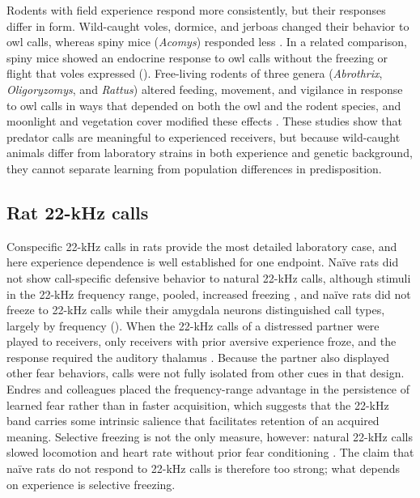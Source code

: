 Rodents with field experience respond more consistently, but their responses differ in form. Wild-caught voles, dormice, and jerboas changed their behavior to owl calls, whereas spiny mice (\textit{Acomys}) responded less \citep{HendrieEtAl1998}. In a related comparison, spiny mice showed an endocrine response to owl calls without the freezing or flight that voles expressed \citep{EilamEtAl1999} ().
Free-living rodents of three genera (\textit{Abrothrix}, \textit{Oligoryzomys}, and \textit{Rattus}) altered feeding, movement, and vigilance in response to owl calls in ways that depended on both the owl and the rodent species, and moonlight and vegetation cover modified these effects \citep{HernandezEtAl2021}. These studies show that predator calls are meaningful to experienced receivers, but because wild-caught animals differ from laboratory strains in both experience and genetic background, they cannot separate learning from population differences in predisposition.

\subsection{Rat 22-kHz calls}
\label{sec:q2-22khz}

Conspecific 22-kHz calls in rats provide the most detailed laboratory case, and here experience dependence is well established for one endpoint. Naïve rats did not show call-specific defensive behavior to natural 22-kHz calls, although stimuli in the 22-kHz frequency range, pooled, increased freezing \citep{EndresEtAl2007}, and naïve rats did not freeze to 22-kHz calls while their amygdala neurons distinguished call types, largely by frequency \citep{ParsanaEtAl2012a} (). When the 22-kHz calls of a distressed partner were played to receivers, only receivers with prior aversive experience froze, and the response required the auditory thalamus \citep{KimEtAl2010}. Because the partner also displayed other fear behaviors, calls were not fully isolated from other cues in that design. Endres and colleagues placed the frequency-range advantage in the persistence of learned fear rather than in faster acquisition, which suggests that the 22-kHz band carries some intrinsic salience that facilitates retention of an acquired meaning. Selective freezing is not the only measure, however: natural 22-kHz calls slowed locomotion and heart rate without prior fear conditioning \citep{OlszynskiEtAl2020}. The claim that naïve rats do not respond to 22-kHz calls is therefore too strong; what depends on experience is selective freezing.

